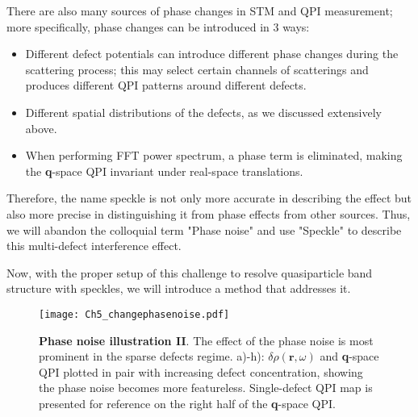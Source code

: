 There are also many sources of phase changes in \ac{STM} and \ac{QPI} measurement; more specifically, phase changes can be introduced in 3 ways: 
\begin{itemize}
	\item Different defect potentials can introduce different phase changes during the scattering process; this may select certain channels of scatterings and produces different QPI patterns around different defects. \cite{chenAtomicallyResolvedDefectEngineering2024}
	\item Different spatial distributions of the defects, as we discussed extensively above. 
	\item When performing FFT power spectrum, a phase term is eliminated, making the \textbf{q}-space \ac{QPI} invariant under real-space translations.
\end{itemize}

Therefore, the name speckle is not only more accurate in describing the effect but also more precise in distinguishing it from phase effects from other sources. Thus, we will abandon the colloquial term "Phase noise" and use "Speckle" to describe this multi-defect interference effect. 

Now, with the proper setup of this challenge to resolve quasiparticle band structure with speckles, we will introduce a method that addresses it. 

\begin{figure}
	\texttt{[image: Ch5\_changephasenoise.pdf]} 
	\centering
	\caption[\textbf{Phase noise illustration II}]{\textbf{Phase noise illustration II}. The effect of the phase noise is most prominent in the sparse defects regime. a)-h): $\delta\rho(\textbf{r},\omega)$ and \textbf{q}-space QPI plotted in pair with increasing defect concentration, showing the phase noise becomes more featureless. Single-defect QPI map is presented for reference on the right half of the \textbf{q}-space QPI.}
	\label{fig:ch5_changephasenoise}
\end{figure}
